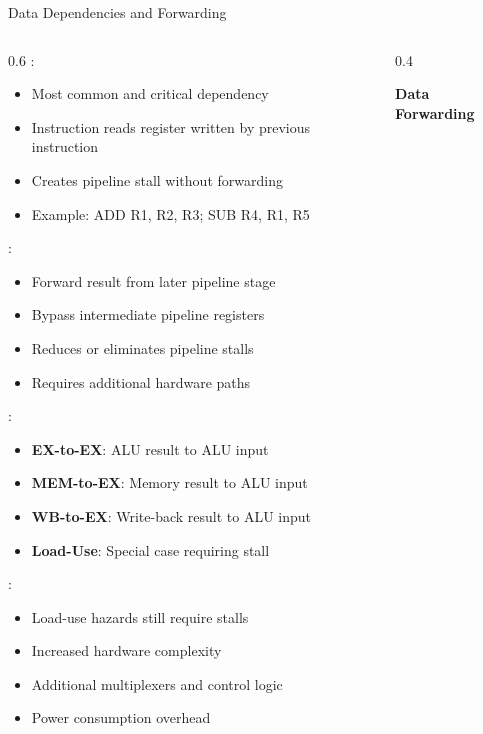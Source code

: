 \begin{frame}{Data Dependencies and Forwarding}
\begin{columns}
\begin{column}{0.6\textwidth}
:
\begin{itemize}
\item Most common and critical dependency
\item Instruction reads register written by previous instruction
\item Creates pipeline stall without forwarding
\item Example: ADD R1, R2, R3; SUB R4, R1, R5
\end{itemize}

\vspace{0.3cm}
:
\begin{itemize}
\item Forward result from later pipeline stage
\item Bypass intermediate pipeline registers
\item Reduces or eliminates pipeline stalls
\item Requires additional hardware paths
\end{itemize}

\vspace{0.3cm}
:
\begin{itemize}
\item \textbf{EX-to-EX}: ALU result to ALU input
\item \textbf{MEM-to-EX}: Memory result to ALU input
\item \textbf{WB-to-EX}: Write-back result to ALU input
\item \textbf{Load-Use}: Special case requiring stall
\end{itemize}

\vspace{0.3cm}
:
\begin{itemize}
\item Load-use hazards still require stalls
\item Increased hardware complexity
\item Additional multiplexers and control logic
\item Power consumption overhead
\end{itemize}
\end{column}
\begin{column}{0.4\textwidth}
\begin{center}
\textbf{Data Forwarding}
\vspace{0.3cm}


\end{center}
\end{column}
\end{columns}
\end{frame}
